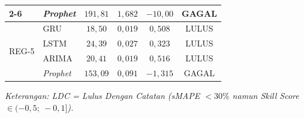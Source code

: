 \begin{table}[htbp]
\begin{tabular}{|p{2.2cm}|p{1.5cm}|c|c|c|c|}
\cline{2-6}
 & \textit{Prophet} & $191{,}81$ & $1{,}682$ & $-10{,}00$ & GAGAL \\
\hline
\multirow{4}{*}{REG-5} & GRU & $18{,}50$ & $0{,}019$ & $0{,}508$ & LULUS \\
\cline{2-6}
 & LSTM & $24{,}39$ & $0{,}027$ & $0{,}323$ & LULUS \\
\cline{2-6}
 & ARIMA & $20{,}41$ & $0{,}019$ & $0{,}516$ & LULUS \\
\cline{2-6}
 & \textit{Prophet} & $153{,}09$ & $0{,}091$ & $-1{,}315$ & GAGAL \\
\hline
\end{tabular}
\begin{flushleft}
\footnotesize\textit{Keterangan: LDC = Lulus Dengan Catatan (sMAPE $< 30\%$ namun \textit{Skill Score} $\in (-0{,}5;\ -0{,}1]$).}
\end{flushleft}
\end{table}
